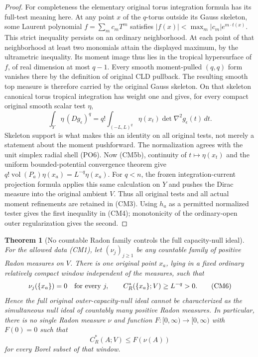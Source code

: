 \documentclass[11pt,a4paper]{article}
\numberwithin{equation}{section}
\newtheorem{theorem}{Theorem}[section]
\theoremstyle{definition}
\theoremstyle{remark}
\begin{document}
\begin{proof}
For completeness the elementary original torus integration formula
has its full-test meaning here. At any point $x$ of the $q$-torus
outside its Gauss skeleton, some Laurent polynomial $f=\sum_m c_mT^m$
satisfies
$|f(x)|<\max_m |c_m|e^{m\cdot t(x)}$. This strict inequality persists
on an ordinary neighborhood. At each point of that neighborhood at
least two monomials attain the displayed maximum, by the ultrametric
inequality. Its moment image thus lies in the tropical hypersurface
of $f$, of real dimension at most $q-1$. Every smooth moment-pulled
$(q,q)$ form vanishes there by the definition of original CLD pullback.
The resulting smooth top measure is therefore carried by the original
Gauss skeleton. On that skeleton canonical torus tropical integration
has weight one and gives, for every compact original smooth scalar
test $\eta$,
\[
  \int_Y \eta\,(Dg_\epsilon)^q
       =q!\int_{(-L,L)^q}\eta(x_t)
                          \det\nabla^2g_\epsilon(t)\,dt.
 \tag{CM5c}
\]
Skeleton support is what makes this an identity on all original
tests, not merely a statement about the moment pushforward.
The normalization agrees with the unit simplex radial shell (PO6).
Now (CM5b), continuity of $t\mapsto\eta(x_t)$ and the uniform
bounded-potential convergence theorem give
$q!\operatorname{vol}(P_a)\eta(x_a)=L^{-q}\eta(x_a)$.
For $q<n$, the frozen integration-current projection formula applies
this same calculation on $Y$ and pushes the Dirac measure into the
original ambient $V$. Thus all original tests and all actual
moment refinements are retained in (CM3).
Using $h_a$ as a permitted normalized tester gives the first
inequality in (CM4); monotonicity of the ordinary-open outer
regularization gives the second.
\end{proof}

\begin{theorem}[No countable Radon family controls the full capacity-null ideal]
\label{thm:r12-no-countable-radon-capacity-control}
For the allowed data (CM1), let $(\nu_j)_{j\geq1}$ be any countable
family of positive Radon measures on $V$. There is one original
point $x_a$, lying in a fixed ordinary relatively compact window
independent of the measures, such that
\[
            \nu_j(\{x_a\})=0\quad\hbox{for every }j,
                  \qquad C_R^*(\{x_a\};V)\geq L^{-q}>0.
 \tag{CM6}
\]
Hence the full original outer-capacity-null ideal cannot be
characterized as the simultaneous null ideal of countably many
positive Radon measures. In particular, there is no single Radon
measure $\nu$ and function $F:[0,\infty)\to[0,\infty)$ with
$F(0)=0$ such that
\[
                         C_R^*(A;V)\leq F(\nu(A))
 \tag{CM7}
\]
for every Borel subset of that window.
\end{theorem}
\end{document}
